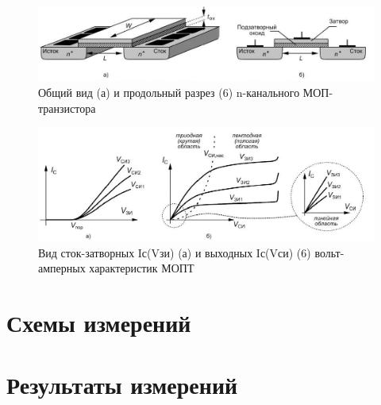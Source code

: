 \documentclass[a4paper,14pt]{article}
\begin{document}
\begin{figure}
	\centering
	\includegraphics[width=\linewidth]{image/Teor_MOP_3}
	\caption{Общий вид (а) и продольный разрез (6) n-канального МОП-транзистора}
	\label{fig:teormop3}
\end{figure}

\begin{figure}
	\centering
	\includegraphics[width=\linewidth]{image/Teor_MOP_4}
	\caption{Вид сток-затворных Iс(Vзи) (а) и выходных Iс(Vси) (6) вольт- амперных характеристик МОПТ}
	\label{fig:teormop4}
\end{figure}

\section{Схемы измерений}

\section{Результаты измерений}
\end{document}

